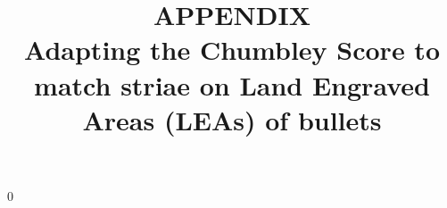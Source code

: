 \documentclass[12pt]{article}
\newcommand{\blind}{0}
\begin{document}
\def\spacingset#1{\renewcommand{\baselinestretch}%
{#1}\small\normalsize} \spacingset{1}





\newpage

\blind
{
  \title{\LARGE\bf APPENDIX \\ Adapting the Chumbley Score to match striae on Land Engraved Areas (LEAs) of bullets}
  \maketitle
} \fi

%
%

\newpage
\spacingset{1.45} %

\newcommand{\cited}[1]{{\textcolor{red}{#1}}}

\setlength\parindent{0pt}
\end{document}
